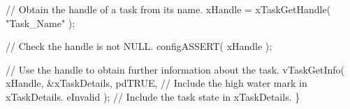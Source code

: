 \begin{DoxyPre}   // Obtain the handle of a task from its name.
   xHandle = xTaskGetHandle( "Task\_Name" );\end{DoxyPre}



\begin{DoxyPre}   // Check the handle is not NULL.
   configASSERT( xHandle );\end{DoxyPre}



\begin{DoxyPre}   // Use the handle to obtain further information about the task.
   vTaskGetInfo( xHandle,
                 \&xTaskDetails,
                 pdTRUE, // Include the high water mark in xTaskDetails.
                 eInvalid ); // Include the task state in xTaskDetails.
\}
  \end{DoxyPre}
 